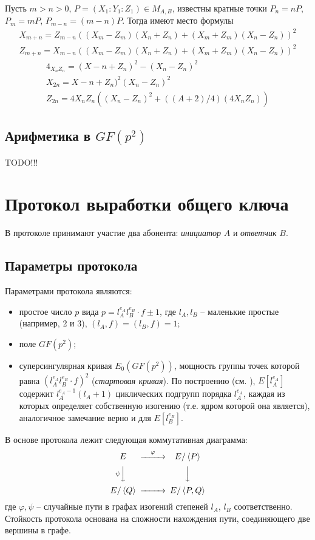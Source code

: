 \documentclass[a4paper,12pt]{article}
\newcommand{\tr}[1]{\left\langle #1\right\rangle}
\theoremstyle{definition}
\begin{document}
Пусть $m>n>0$, $P=(X_1:Y_1:Z_1)\in M_{A,B}$, известны кратные точки $P_{n}=nP$, $P_{m}=mP$, $P_{m-n}=(m-n)P$. Тогда имеют место формулы
\begin{eqnarray*}
X_{m+n}=Z_{m-n}((X_m-Z_m)(X_n+Z_n)+(X_m+Z_m)(X_n-Z_n))^2\\
Z_{m+n}=X_{m-n}((X_m-Z_m)(X_n+Z_n)+(X_m+Z_m)(X_n-Z_n))^2
\end{eqnarray*}
\begin{eqnarray*}
4_{X_nZ_n}=(X-n+Z_n)^2-(X_n-Z_n)^2\\
X_{2n}=X-n+Z_n)^2(X_n-Z_n)^2\\
Z_{2n}=4X_nZ_n((X_n-Z_n)^2+((A+2)/4)(4X_nZ_n))
\end{eqnarray*}


\subsection{Арифметика в $GF(p^2)$}

TODO!!!

\section{Протокол выработки общего ключа}\label{protodesc}

В протоколе принимают участие два абонента: \emph{инициатор} $A$ и \emph{ответчик} $B$.

\subsection*{Параметры протокола}

Параметрами протокола являются:
\begin{itemize}
 \item простое число $p$ вида $ p=l_A^{e_A}l_B^{e_B}\cdot f  \pm 1$, где $l_A,l_B$ -- маленькие простые (например, 2 и 3),
$(l_A,f)=(l_B,f)=1$;
\item поле $GF(p^2)$;
\item суперсингулярная кривая $E_0(GF(p^2))$, мощность группы точек которой равна $(l_A^{e_A}l_B^{e_B}\cdot f)^2$ (\emph{стартовая кривая}). По построению (см. \cite{DF}), $E[l_A^{e_A}]$ содержит $l_A^{e_A-1}(l_A+1)$ циклических подгрупп порядка $l_A^{e_A}$, каждая из которых определяет собственную изогению (т.е. ядром которой она является), аналогичное замечание  верно и для $E[l_B^{e_B}]$.
\end{itemize}

В основе протокола лежит следующая коммутативная диаграмма:
\begin{equation}\label{comd}
\begin{CD}
 E @>\varphi >> E/\tr{P} \\
 @V\psi VV @VVV \\
 E/\tr{Q} @>>> E/\tr{P,Q}
\end{CD}
\end{equation}
где $\varphi, \psi$ -- случайные пути в графах изогений степеней $l_A$, $l_B$ соответственно. Стойкость протокола основана на 
сложности нахождения пути, соединяющего две вершины в графе.
\end{document}

